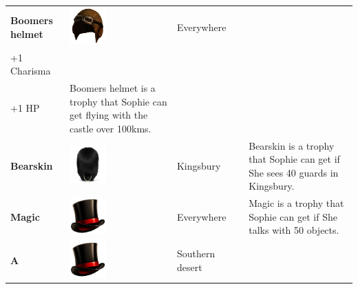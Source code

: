 \begin{longtable}[H]{|p{2cm}|p{1.5cm}|p{2cm}|p{2.8cm}|p{6.3cm}|}
\textbf{Boomers helmet}              & \includegraphics[width=1.4cm]{Images/Hats/boomersHelmet}      & Everywhere                                                     & \begin{tabular}[c]{@{}l@{}}+3 Dexterity\\ +1 Charisma\\ +1 HP\end{tabular}            & Boomers helmet is a trophy that Sophie can get flying with the castle over 100kms.                                                     \\ \hline
\textbf{Bearskin}                    & \includegraphics[width=1.4cm]{Images/Hats/bearskin}           & Kingsbury                                                      &                                                                                       & Bearskin is a trophy that Sophie can get if She sees 40 guards in Kingsbury.                                                           \\ \hline
\textbf{Magic}                       & \includegraphics[width=1.4cm]{Images/Hats/magic}              & Everywhere                                                     &                                                                                       & Magic is a trophy that Sophie can get if She talks with 50 objects.                                                                    \\ \hline
\textbf{A}                           & \includegraphics[width=1.4cm]{Images/Hats/magic}              & Southern desert                                                &                                                                                       &                                                                                                                                        \\ \hline

\end{longtable}
